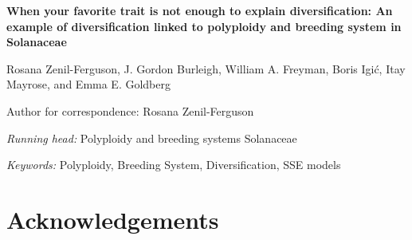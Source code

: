 \documentclass[11pt]{article}
\begin{document}

\begin{center}
    \textbf{When your favorite trait is not enough to explain diversification: An example of diversification linked to polyploidy and breeding system in Solanaceae}
\end{center}

\vfill

\noindent
Rosana Zenil-Ferguson,%
%
\noindent
J. Gordon Burleigh,%
%
\noindent
William A. Freyman,%
%
\noindent
Boris Igi\'c,%
%
\noindent
Itay Mayrose,%
%
and
Emma E. Goldberg%

\vfill

\theendnotes

\noindent
Author for correspondence: Rosana Zenil-Ferguson

\vfill

\noindent
\textit{Running head:} Polyploidy and breeding systems Solanaceae

\vfill

\noindent
\textit{Keywords:} 
Polyploidy,
Breeding System,
Diversification, SSE models

\vfill

\linenumbers


\clearpage



\clearpage





\section{Acknowledgements}


\clearpage



\setstretch{\stretchby}
\end{document}
